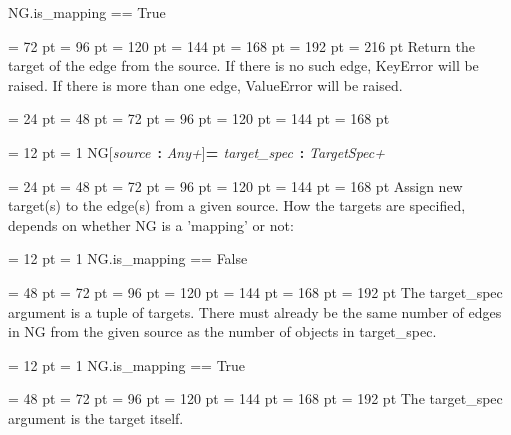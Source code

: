 {{{{{{ NG.is{\_}mapping == True\par}
{\par \noindent  \leftskip = 72 pt  \leftmargini = 96 pt  \leftmarginii = 120 pt  \leftmarginiii = 144 pt  \leftmarginiv = 168 pt  \leftmarginv = 192 pt  \leftmarginvi = 216 pt  Return the target of the edge from the source.
          If there is no such edge, KeyError will be raised.
          If there is more than one edge, ValueError will be raised.\par}
\par}
\par}
\par}
\par}
{\par \noindent  \leftskip = 24 pt  \leftmargini = 48 pt  \leftmarginii = 72 pt  \leftmarginiii = 96 pt  \leftmarginiv = 120 pt  \leftmarginv = 144 pt  \leftmarginvi = 168 pt {\par \noindent
\par}
\par}
{\par \pagebreak[3.300000] \noindent \hangindent = 12 pt \hangafter = 1 
NG{[}{\em source\/}~{\bf :}  {\em Any+\/}]{\bf {\large {\bf  = \/}}\/}{\em target{\_}spec\/}~{\bf :}  {\em TargetSpec+\/}\par}
{\par \noindent  \leftskip = 24 pt  \leftmargini = 48 pt  \leftmarginii = 72 pt  \leftmarginiii = 96 pt  \leftmarginiv = 120 pt  \leftmarginv = 144 pt  \leftmarginvi = 168 pt  Assign new target(s) to the edge(s) from a given source. How the
targets are specified, depends on whether NG is a 'mapping' or not:{\par \noindent
{\par \pagebreak[3.200000] \noindent \hangindent = 12 pt \hangafter = 1 
 NG.is{\_}mapping == False\par}
{\par \noindent  \leftskip = 48 pt  \leftmargini = 72 pt  \leftmarginii = 96 pt  \leftmarginiii = 120 pt  \leftmarginiv = 144 pt  \leftmarginv = 168 pt  \leftmarginvi = 192 pt  The target{\_}spec argument is a tuple of targets.
    There must already be the same number of edges in NG from the given
    source as the number of objects in target{\_}spec.\par}
{\par \pagebreak[3.200000] \noindent \hangindent = 12 pt \hangafter = 1 
 NG.is{\_}mapping == True\par}
{\par \noindent  \leftskip = 48 pt  \leftmargini = 72 pt  \leftmarginii = 96 pt  \leftmarginiii = 120 pt  \leftmarginiv = 144 pt  \leftmarginv = 168 pt  \leftmarginvi = 192 pt  The target{\_}spec argument is the target itself.
}}}}
